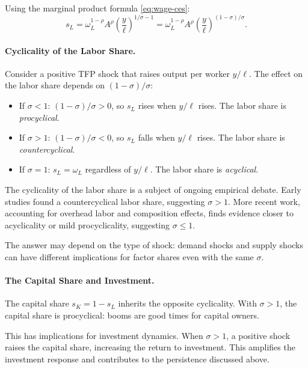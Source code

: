 Using the marginal product formula \cref{eq:wage-ces}:
\begin{equation}
s_L = \omega_L^{1-\rho} A^\rho \left( \frac{y}{\ell} \right)^{1/\sigma - 1} = \omega_L^{1-\rho} A^\rho \left( \frac{y}{\ell} \right)^{(1-\sigma)/\sigma}.
\label{eq:labor-share-formula}
\end{equation}

\paragraph{Cyclicality of the Labor Share.}
Consider a positive TFP shock that raises output per worker $y/\ell$. The effect on the labor share depends on $(1-\sigma)/\sigma$:
\begin{itemize}[nosep]
\item If $\sigma < 1$: $(1-\sigma)/\sigma > 0$, so $s_L$ rises when $y/\ell$ rises. The labor share is \emph{procyclical}.
\item If $\sigma > 1$: $(1-\sigma)/\sigma < 0$, so $s_L$ falls when $y/\ell$ rises. The labor share is \emph{countercyclical}.
\item If $\sigma = 1$: $s_L = \omega_L$ regardless of $y/\ell$. The labor share is \emph{acyclical}.
\end{itemize}

\begin{calloutnote}
The cyclicality of the labor share is a subject of ongoing empirical debate. Early studies found a countercyclical labor share, suggesting $\sigma > 1$. More recent work, accounting for overhead labor and composition effects, finds evidence closer to acyclicality or mild procyclicality, suggesting $\sigma \leq 1$.

The answer may depend on the type of shock: demand shocks and supply shocks can have different implications for factor shares even with the same $\sigma$.
\end{calloutnote}

\paragraph{The Capital Share and Investment.}
The capital share $s_K = 1 - s_L$ inherits the opposite cyclicality. With $\sigma > 1$, the capital share is procyclical: booms are good times for capital owners.

This has implications for investment dynamics. When $\sigma > 1$, a positive shock raises the capital share, increasing the return to investment. This amplifies the investment response and contributes to the persistence discussed above.

